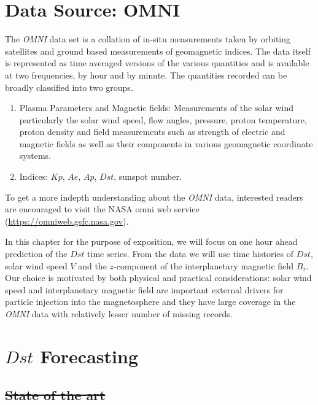 \documentclass{article}
\providecommand{\DIFadd}[1]{{\protect\color{blue}\uwave{#1}}} %
\providecommand{\DIFdel}[1]{{\protect\color{red}\sout{#1}}}                      %
\providecommand{\DIFaddbegin}{} %
\providecommand{\DIFaddend}{} %
\providecommand{\DIFdelbegin}{} %
\providecommand{\DIFdelend}{} %
\newcommand{\DIFscaledelfig}{0.5}
\newlength{\DIFdelgraphicswidth} %
\newlength{\DIFdelgraphicsheight} %
\newcommand{\DIFaddincludegraphics}[2][]{{\color{blue}\fbox{\DIFOincludegraphics[#1]{#2}}}} %
\newcommand{\DIFdelincludegraphics}[2][]{%
\sbox{\DIFdelgraphicsbox}{\DIFOincludegraphics[#1]{#2}}%
\settoboxwidth{\DIFdelgraphicswidth}{\DIFdelgraphicsbox} %
\settoboxtotalheight{\DIFdelgraphicsheight}{\DIFdelgraphicsbox} %
\scalebox{\DIFscaledelfig}{%
\parbox[b]{\DIFdelgraphicswidth}{\usebox{\DIFdelgraphicsbox}\\[-\baselineskip] \rule{\DIFdelgraphicswidth}{0em}}\llap{\resizebox{\DIFdelgraphicswidth}{\DIFdelgraphicsheight}{%
\setlength{\unitlength}{\DIFdelgraphicswidth}%
\begin{picture}(1,1)%
\thicklines\linethickness{2pt} %
{\color[rgb]{1,0,0}\put(0,0){\framebox(1,1){}}}%
{\color[rgb]{1,0,0}\put(0,0){\line( 1,1){1}}}%
{\color[rgb]{1,0,0}\put(0,1){\line(1,-1){1}}}%
\end{picture}%
}\hspace*{3pt}}} %
} %
\DeclareRobustCommand{\DIFaddbegin}{\DIFOaddbegin \let\includegraphics\DIFaddincludegraphics} %
\DeclareRobustCommand{\DIFaddend}{\DIFOaddend \let\includegraphics\DIFOincludegraphics} %
\DeclareRobustCommand{\DIFdelbegin}{\DIFOdelbegin \let\includegraphics\DIFdelincludegraphics} %
\DeclareRobustCommand{\DIFdelend}{\DIFOaddend \let\includegraphics\DIFOincludegraphics} %
\begin{document}
\section{Data Source: OMNI}
The \emph{OMNI} data set is a collation of in-situ measurements taken by orbiting satellites and ground based measurements of geomagnetic indices. The data itself is represented as time averaged versions of the various quantities and is available at two frequencies, by hour and by minute. The quantities recorded can be broadly classified into two groups.

\begin{enumerate}

\item Plasma Parameters and Magnetic fields: Measurements of the solar wind particularly the solar wind speed, flow angles, pressure, proton temperature, proton density and field measurements such as strength of electric and magnetic fields as well as their components in various geomagnetic coordinate systems.

\item Indices: $Kp$, $Ae$, $Ap$, $Dst$, sunspot number.

\end{enumerate}

To get a more indepth understanding about the \emph{OMNI} data, interested readers are encouraged to visit the NASA omni web service (\url{https://omniweb.gsfc.nasa.gov}).

In this chapter for the purpose of exposition, we will focus on one hour ahead prediction of the $Dst$ time series. From the data we will use time histories of $Dst$, solar wind speed $V$ and the $z$-component of the interplanetary magnetic field $B_z$. Our choice is motivated by both physical and practical considerations: solar wind speed and interplanetary magnetic field are important external drivers for particle injection into the magnetosphere and they have large coverage in the \emph{OMNI} data with relatively lesser number of missing records.

\section{$Dst$ Forecasting}

\subsection{\DIFdelbegin \DIFdel{State of the art}\DIFdelend \DIFaddbegin \DIFadd{Models \& Algorithms}\DIFaddend }
\end{document}
